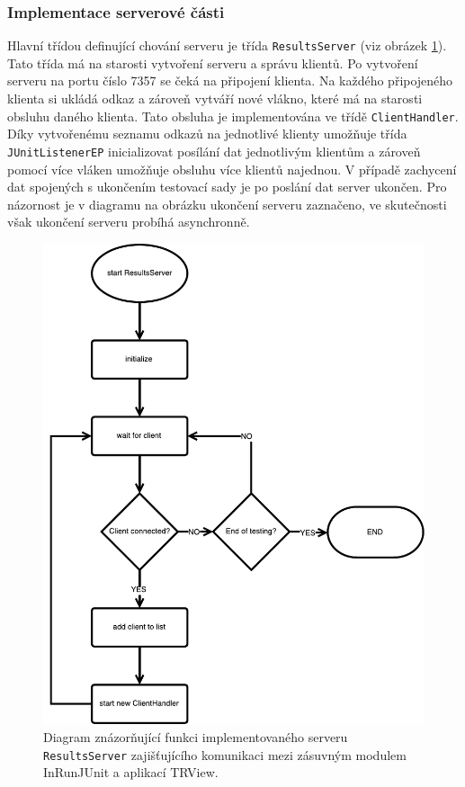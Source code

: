       \subsubsection{Implementace serverové části}
	Hlavní třídou definující chování serveru je třída \texttt{ResultsServer} (viz obrázek \ref{fig:resultsserver_flowchart}). Tato třída má na starosti vytvoření serveru a správu klientů. Po vytvoření serveru na portu číslo 7357 se čeká na připojení klienta. Na každého připojeného klienta si ukládá odkaz a zároveň vytváří nové vlákno, které má na starosti obsluhu daného klienta. Tato obsluha je implementována ve třídě \texttt{ClientHandler}. Díky vytvořenému seznamu odkazů na jednotlivé klienty umožňuje třída \texttt{JUnitListenerEP} inicializovat posílání dat jednotlivým klientům a zároveň pomocí více vláken umožňuje obsluhu více klientů najednou. V případě zachycení dat spojených s ukončením testovací sady je po poslání dat server ukončen. Pro názornost je v diagramu na obrázku ukončení serveru zaznačeno, ve skutečnosti však ukončení serveru probíhá asynchronně.
	
	\begin{figure}[h]
	  \includegraphics[width=\textwidth, center]{obrazky-figures/inrunjunit_resultsserver_flowchart.pdf}
	  \caption{Diagram znázorňující funkci implementovaného serveru \texttt{ResultsServer} zajišťujícího komunikaci mezi zásuvným modulem InRunJUnit a aplikací TRView.}
	  \label{fig:resultsserver_flowchart}
	\end{figure}

